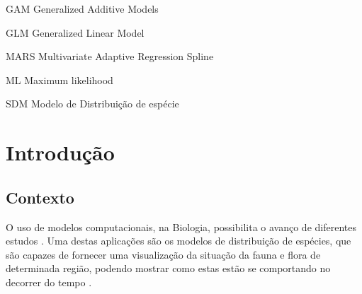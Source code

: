 \documentclass[
	12pt,				%
	openright,			%
	oneside,			%
	a4paper,			%
	english,			%
	brazil				%
	]{abntex2}
\begin{document}
\listoffigures*
\cleardoublepage

\listoftables*
\cleardoublepage

\begin{siglas}
  \item[GAM] Generalized Additive Models
  \item[GLM] Generalized Linear Model
  \item[MARS] Multivariate Adaptive Regression Spline
  \item[ML] Maximum likelihood
  \item[SDM] Modelo de Distribuição de espécie
\end{siglas}

\tableofcontents*
\cleardoublepage

\textual
\chapter{Introdução}

\section{Contexto}

O uso de modelos computacionais, na Biologia, possibilita o avanço de diferentes
estudos \cite{modelagem_comp}. Uma destas aplicações são os modelos de distribuição 
de espécies, que são capazes de fornecer uma visualização da situação 
da fauna e flora de determinada região, podendo mostrar como estas estão se 
comportando no decorrer do tempo \cite{speciesDistributionModels}.
\end{document}

